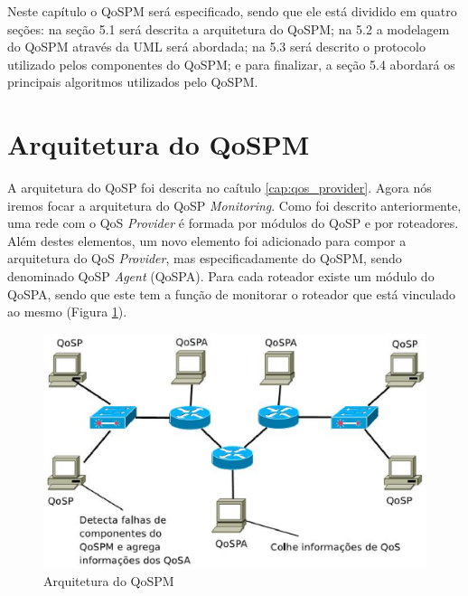 \label{cap:especificacao}
\acresetall

	Neste capítulo o QoSPM será especificado, sendo que ele está dividido em quatro seções: na seção 5.1 será descrita a arquitetura do QoSPM; na 5.2 a modelagem do QoSPM através da UML será abordada; na 5.3 será descrito o protocolo utilizado pelos componentes do QoSPM; e para finalizar, a seção 5.4 abordará os principais algoritmos utilizados pelo QoSPM.

\section{Arquitetura do QoSPM}

	A arquitetura do QoSP foi descrita no caítulo \ref{cap:qos_provider}. Agora nós iremos focar a arquitetura do QoSP \textit{Monitoring}. Como foi descrito anteriormente, uma rede com o QoS \textit{Provider} é formada por módulos do QoSP e por roteadores. Além destes elementos, um novo elemento foi adicionado para compor a arquitetura do QoS \textit{Provider}, mas especificadamente do QoSPM, sendo denominado QoSP \textit{Agent} (QoSPA). Para cada roteador existe um módulo do QoSPA, sendo que este tem a função de monitorar o roteador que está vinculado ao mesmo (Figura \ref{fig:arquitetura_qosp}).
	
\begin{figure}
\centering
\includegraphics[scale=0.7]{arquitetura_qospm}
\caption{Arquitetura do QoSPM}
\label{fig:arquitetura_qosp}
\end{figure}

